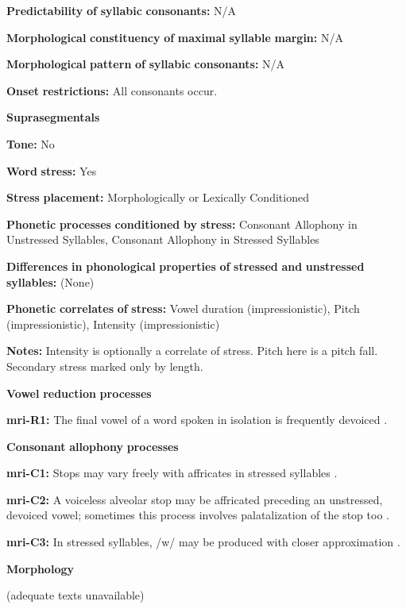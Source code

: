 \textbf{Predictability} \textbf{of} \textbf{syllabic} \textbf{consonants:} N/A

\textbf{Morphological} \textbf{constituency} \textbf{of} \textbf{maximal} \textbf{syllable} \textbf{margin:} N/A

\textbf{Morphological} \textbf{pattern} \textbf{of} \textbf{syllabic} \textbf{consonants:} N/A

\textbf{Onset} \textbf{restrictions:} All consonants occur.

\textbf{Suprasegmentals}

\textbf{Tone:} No

\textbf{Word} \textbf{stress:} Yes

\textbf{Stress} \textbf{placement:} Morphologically or Lexically Conditioned

\textbf{Phonetic} \textbf{processes} \textbf{conditioned} \textbf{by} \textbf{stress:} Consonant Allophony in Unstressed Syllables, Consonant Allophony in Stressed Syllables

\textbf{Differences} \textbf{in} \textbf{phonological} \textbf{properties} \textbf{of} \textbf{stressed} \textbf{and} \textbf{unstressed} \textbf{syllables:} (None)

\textbf{Phonetic} \textbf{correlates} \textbf{of} \textbf{stress:} Vowel duration (impressionistic), Pitch (impressionistic), Intensity (impressionistic)

\textbf{Notes:} Intensity is optionally a correlate of stress. Pitch here is a pitch fall. Secondary stress marked only by length.

\textbf{Vowel} \textbf{reduction} \textbf{processes}

\textbf{mri-R1:} The final vowel of a word spoken in isolation is frequently devoiced \citep[546]{Bauer1999}.

\textbf{Consonant} \textbf{allophony} \textbf{processes}

\textbf{mri-C1:} Stops may vary freely with affricates in stressed syllables \citep[545]{Bauer1999}.

\textbf{mri-C2:} A voiceless alveolar stop may be affricated preceding an unstressed, devoiced vowel; sometimes this process involves palatalization of the stop too \citep{Bauer1999}.

\textbf{mri-C3:} In stressed syllables, /w/ may be produced with closer approximation \citep[545]{Bauer1999}.

\textbf{Morphology}

(adequate texts unavailable)

